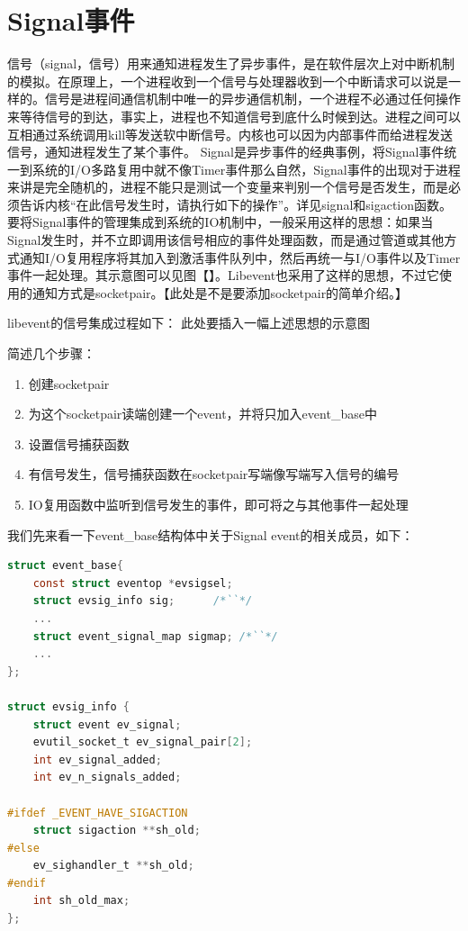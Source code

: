 \documentclass[11pt,a4paper]{article}
\begin{document}
\newpage

\section{Signal事件}
信号（signal，信号）用来通知进程发生了异步事件，是在软件层次上对中断机制的模拟。在原理上，一个进程收到一个信号与处理器收到一个中断请求可以说是一样的。信号是进程间通信机制中唯一的异步通信机制，一个进程不必通过任何操作来等待信号的到达，事实上，进程也不知道信号到底什么时候到达。进程之间可以互相通过系统调用kill等发送软中断信号。内核也可以因为内部事件而给进程发送信号，通知进程发生了某个事件。
Signal是异步事件的经典事例，将Signal事件统一到系统的I/O多路复用中就不像Timer事件那么自然，Signal事件的出现对于进程来讲是完全随机的，进程不能只是测试一个变量来判别一个信号是否发生，而是必须告诉内核“在此信号发生时，请执行如下的操作”。详见signal和sigaction函数。
要将Signal事件的管理集成到系统的IO机制中，一般采用这样的思想：如果当Signal发生时，并不立即调用该信号相应的事件处理函数，而是通过管道或其他方式通知I/O复用程序将其加入到激活事件队列中，然后再统一与I/O事件以及Timer事件一起处理。其示意图可以见图【】。Libevent也采用了这样的思想，不过它使用的通知方式是socketpair。【此处是不是要添加socketpair的简单介绍。】

libevent的信号集成过程如下：
此处要插入一幅上述思想的示意图

简述几个步骤：
\begin{enumerate}
\item 创建socketpair
\item 为这个socketpair读端创建一个event，并将只加入event\_base中
\item 设置信号捕获函数
\item 有信号发生，信号捕获函数在socketpair写端像写端写入信号的编号
\item IO复用函数中监听到信号发生的事件，即可将之与其他事件一起处理
\end{enumerate}

我们先来看一下event\_base结构体中关于Signal event的相关成员，如下：
\begin{lstlisting}[language=C]
struct event_base{
	const struct eventop *evsigsel;
	struct evsig_info sig;		/*``*/
	...
	struct event_signal_map sigmap;	/*``*/
	...
};

struct evsig_info {
	struct event ev_signal;
	evutil_socket_t ev_signal_pair[2];
	int ev_signal_added;
	int ev_n_signals_added;

#ifdef _EVENT_HAVE_SIGACTION
	struct sigaction **sh_old;
#else
	ev_sighandler_t **sh_old;
#endif
	int sh_old_max;
};
\end{lstlisting}
\end{document}
